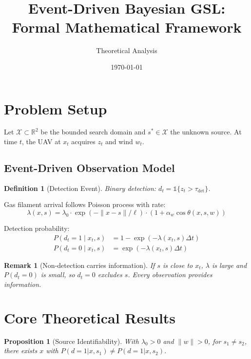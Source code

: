 \documentclass[11pt]{article}
\newtheorem{proposition}[theorem]{Proposition}
\newtheorem{definition}[theorem]{Definition}
\newtheorem{remark}[theorem]{Remark}
\begin{document}
\title{Event-Driven Bayesian GSL: Formal Mathematical Framework}
\author{Theoretical Analysis}
\date{\today}
\maketitle

\section{Problem Setup}
Let $\mathcal{X} \subset \mathbb{R}^2$ be the bounded search domain and $s^* \in \mathcal{X}$ the unknown source. At time $t$, the UAV at $x_t$ acquires $z_t$ and wind $w_t$.

\subsection{Event-Driven Observation Model}
\begin{definition}[Detection Event]
Binary detection: $d_t = \mathbb{1}\{z_t > \tau_{\mathrm{det}}\}$.
\end{definition}

Gas filament arrival follows Poisson process with rate:
\begin{equation}
\lambda(x, s) = \lambda_0 \cdot \exp\!\left(-\|x - s\|/\ell\right) \cdot (1 + \alpha_w \cos\theta(x,s,w))
\end{equation}

Detection probability:
\begin{align}
P(d_t\!=\!1 \mid x_t, s) &= 1 - \exp(-\lambda(x_t, s)\Delta t) \\
P(d_t\!=\!0 \mid x_t, s) &= \exp(-\lambda(x_t, s)\Delta t)
\end{align}

\begin{remark}[Non-detection carries information]
If $s$ is close to $x_t$, $\lambda$ is large and $P(d_t\!=\!0)$ is small, so $d_t\!=\!0$ excludes $s$. Every observation provides information.
\end{remark}

\section{Core Theoretical Results}

\begin{proposition}[Source Identifiability]
With $\lambda_0 > 0$ and $\|w\| > 0$, for $s_1 \neq s_2$, there exists $x$ with $P(d\!=\!1|x,s_1) \neq P(d\!=\!1|x,s_2)$.
\end{proposition}
\end{document}
